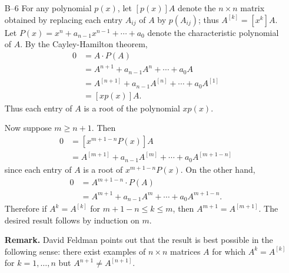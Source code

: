 \documentclass[amssymb,twocolumn,pra,10pt,aps]{revtex4-1}
\begin{document}
\begin{itemize}
\item[B--6]
For any polynomial $p(x)$, let $[p(x)]A$ denote the $n\times n$ matrix obtained by replacing each entry $A_{ij}$ of $A$ by $p(A_{ij})$; thus $A^{[k]} = [x^k]A$. Let $P(x) = x^n + a_{n-1}x^{n-1} + \cdots + a_0$ denote the characteristic polynomial of $A$. By the Cayley-Hamilton theorem,
\begin{align*}
0 &= A \cdot P(A) \\
&= A^{n+1} + a_{n-1}A^n+\cdots+a_0 A \\
&= A^{[n+1]}+a_{n-1}A^{[n]}+\cdots + a_0 A^{[1]} \\
&=[xp(x)]A.
\end{align*}
Thus each entry of $A$ is a root of the polynomial $xp(x)$.

Now suppose $m \geq n+1$. Then
\begin{align*}
0 &= [x^{m+1-n}P(x)]A  \\
&= A^{[m+1]} + a_{n-1} A^{[m]} + \cdots + a_0 A^{[m+1-n]}
\end{align*}
since each entry of $A$ is a root of $x^{m+1-n}P(x)$. On the other hand,
\begin{align*}
0 &= A^{m+1-n} \cdot P(A) \\
&= A^{m+1} + a_{n-1} A^m + \cdots + a_0 A^{m+1-n}.
\end{align*}
Therefore if $A^k = A^{[k]}$ for $m+1-n \leq k \leq m$, then $A^{m+1} = A^{[m+1]}$. The desired result follows by induction on $m$.

\textbf{Remark.}
David Feldman points out that the result is best possible in the following sense: there exist
examples of $n \times n$ matrices $A$ for which $A^k = A^{[k]}$ for $k=1,\dots,n$ but $A^{n+1} \neq A^{[n+1]}$.

\end{itemize}
\end{document}
